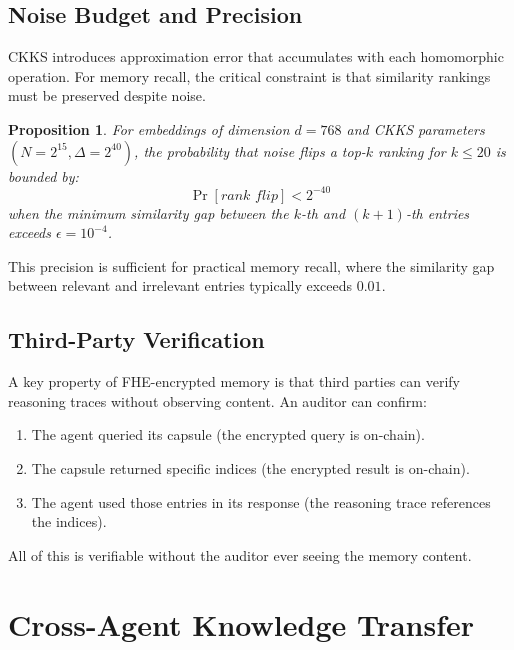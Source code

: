 \documentclass[11pt,letterpaper]{article}
\newtheorem{proposition}[theorem]{Proposition}
\theoremstyle{definition}
\theoremstyle{remark}
\newcommand{\CKKS}{\textsc{CKKS}}
\newcommand{\FHE}{\textsc{FHE}}
\begin{document}
\subsection{Noise Budget and Precision}

\CKKS{} introduces approximation error that accumulates with each homomorphic operation. For memory recall, the critical constraint is that similarity rankings must be preserved despite noise.

\begin{proposition}
For embeddings of dimension $d = 768$ and \CKKS{} parameters $(N = 2^{15}, \Delta = 2^{40})$, the probability that noise flips a top-$k$ ranking for $k \leq 20$ is bounded by:
\begin{equation}
\Pr[\textit{rank flip}] < 2^{-40}
\end{equation}
when the minimum similarity gap between the $k$-th and $(k+1)$-th entries exceeds $\epsilon = 10^{-4}$.
\end{proposition}

This precision is sufficient for practical memory recall, where the similarity gap between relevant and irrelevant entries typically exceeds $0.01$.

\subsection{Third-Party Verification}

A key property of \FHE{}-encrypted memory is that third parties can verify reasoning traces without observing content. An auditor can confirm:
\begin{enumerate}
    \item The agent queried its capsule (the encrypted query is on-chain).
    \item The capsule returned specific indices (the encrypted result is on-chain).
    \item The agent used those entries in its response (the reasoning trace references the indices).
\end{enumerate}

All of this is verifiable without the auditor ever seeing the memory content.

\section{Cross-Agent Knowledge Transfer}
\label{sec:sharing}
\end{document}
